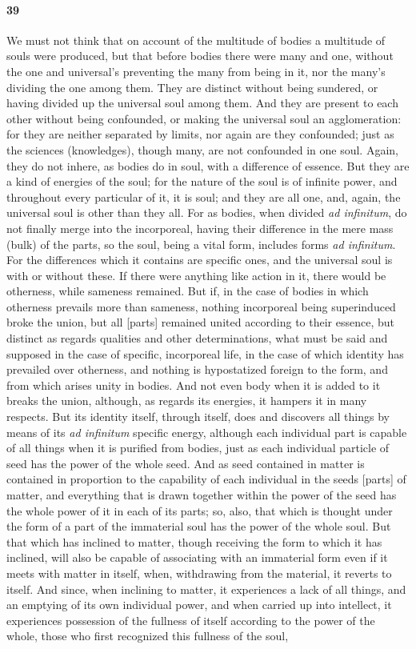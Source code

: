 \documentclass[12pt]{article}
\begin{document}
\paragraph{39} We must not think that on account of the multitude of bodies a multitude of souls were produced, but that before bodies there were many and one, without the one and universal's preventing the many from being in it, nor the many's dividing the one among them. They are distinct without being sundered, or having divided up the universal soul among them. And they are present to each other without being confounded, or making the universal soul an agglomeration: for they are neither separated by limits, nor again are they confounded; just as the sciences (knowledges), though many, are not confounded in one soul. Again, they do not inhere, as bodies do in soul, with a difference of essence. But they are a kind of energies of the soul; for the nature of the soul is of infinite power, and throughout every particular of it, it is soul; and they are all one, and, again, the universal soul is other than they all. For as bodies, when divided \textit{ad infinitum}, do not finally merge into the incorporeal, having their difference in the mere mass (bulk) of the parts, so the soul, being a vital form, includes forms \textit{ad infinitum}. For the differences which it contains are specific ones, and the universal soul is with or without these. If there were anything like action in it, there would be otherness, while sameness remained. But if, in the case of bodies in which otherness prevails more than sameness, nothing incorporeal being superinduced broke the union, but all [parts] remained united according to their essence, but distinct as regards qualities and other determinations, what must be said and supposed in the case of specific, incorporeal life, in the case of which identity has prevailed over otherness, and nothing is hypostatized foreign to the form, and from which arises unity in bodies. And not even body when it is added to it breaks the union, although, as regards its energies, it hampers it in many respects. But its identity itself, through itself, does and discovers all things by means of its \textit{ad infinitum} specific energy, although each individual part is capable of all things when it is purified from bodies, just as each individual particle of seed has the power of the whole seed. And as seed contained in matter is contained in proportion to the capability of each individual in the seeds [parts] of matter, and everything that is drawn together within the power of the seed has the whole power of it in each of its parts; so, also, that which is thought under the form of a part of the immaterial soul has the power of the whole soul. But that which has inclined to matter, though receiving the form to which it has inclined, will also be capable of associating with an immaterial form even if it meets with matter in itself, when, withdrawing from the material, it reverts to itself. And since, when inclining to matter, it experiences a lack of all things, and an emptying of its own individual power, and when carried up into intellect, it experiences possession of the fullness of itself according to the power of the whole, those who first recognized this fullness of the soul, 
\end{document}
